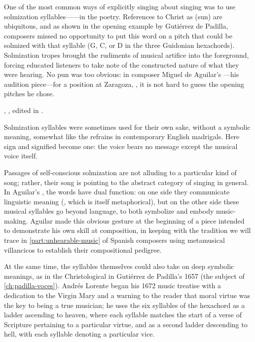 One of the most common ways of explicitly singing about singing was to use
solmization syllables------in the poetry.
References to Christ as  (sun) are ubiquitous, and as shown in the
opening example by Gutiérrez de Padilla, composers missed no opportunity to put
this word on a pitch that could be solmized with that syllable (G, C, or D in
the three Guidonian hexachords).
Solmization tropes brought the rudiments of musical artifice into the
foreground, forcing educated listeners to take note of the constructed nature
of what they were hearing.
No pun was too obvious: in composer Miguel de Aguilar's ---his
audition piece---for a position at Zaragoza, , it
is not hard to guess the opening pitches he chose.%
\begin{Footnote}
    , , edited
    in \autocite[34--64]{Ezquerro:MME55}.
\end{Footnote}
Solmization syllables were sometimes used for their own sake, without a
symbolic meaning, somewhat like the  refrains in contemporary
English madrigals.
Here sign and signified become one: the voice bears no message except the
musical voice itself.

Passages of self-conscious solmization are not alluding to a particular kind of
song; rather, their song is pointing to the abstract category of
singing in general.
In Aguilar's , the words have dual function: on one side
they communicate linguistic meaning (, which is itself
metaphorical), but on the other side these musical syllables go beyond
language, to both symbolize and embody music-making. 
Aguilar made this obvious gesture at the beginning of a piece intended to
demonstrate his own skill at composition, in keeping with the tradition we will
trace in \cref{part:unhearable-music} of Spanish composers using metamusical
villancicos to establish their compositional pedigree.

At the same time, the syllables themselves could also take on deep symbolic
meanings, as in the Christological  in
Gutiérrez de Padilla's 1657  (the subject of
\cref{ch:padilla-voces}).
Andrés Lorente began his 1672 music treatise with a dedication to the Virgin
Mary and a warning to the reader that moral virtue was the key to being a true
musician; he uses the six syllables of the hexachord as a ladder ascending to
heaven, where each syllable matches the start of a verse of Scripture
pertaining to a particular virtue, and as a second ladder descending to
hell\XXX[check], with each syllable denoting a particular vice.%
    \Autocite{Lorente:Porque}

